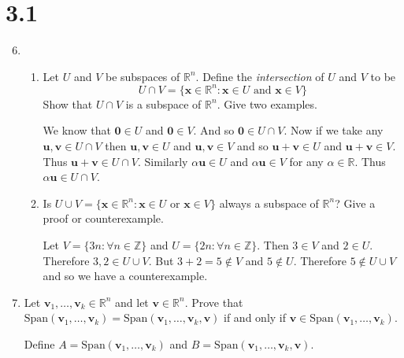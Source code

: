 \documentclass[letterpaper]{article}
\begin{document}
\section*{3.1}
\begin{enumerate}
\setcounter{enumi}{5}
\item
  \begin{enumerate}
  \item
  Let $U$ and $V$ be subspaces of $\mathbb{R}^n$. Define the \emph{intersection} of $U$ and $V$ to be
  \[U\cap V=\{\mathbf{x}\in \mathbb{R}^n:\mathbf{x}\in U\text{ and }\mathbf{x}\in V\}\]
  Show that $U\cap V$ is a subspace of $\mathbb{R}^n$. Give two examples.

  We know that $\mathbf{0}\in U$ and $\mathbf{0}\in V$. And so $\mathbf{0}\in U\cap V$. Now if we take any $\mathbf{u},\mathbf{v}\in U\cap V$ then $\mathbf{u},\mathbf{v}\in U$ and $\mathbf{u},\mathbf{v}\in V$ and so $\mathbf{u}+\mathbf{v}\in U$ and $\mathbf{u}+\mathbf{v}\in V$. Thus $\mathbf{u}+\mathbf{v}\in  U\cap V$. Similarly $\alpha\mathbf{u}\in U$ and $\alpha\mathbf{u}\in V$ for any $\alpha\in \mathbb{R}$. Thus $\alpha\mathbf{u}\in U\cap V$.
  \item
  Is $U\cup V=\{\mathbf{x}\in \mathbb{R}^n:\mathbf{x}\in U\text{ or }\mathbf{x}\in V\}$ always a subspace of $\mathbb{R}^n$? Give a proof or counterexample.

  Let $V=\{3n:\forall n\in \mathbb{Z}\}$ and $U=\{2n:\forall n\in \mathbb{Z}\}$. Then $3\in V$ and $2\in U$. Therefore $3,2\in U\cup V$. But $3+2=5\not\in V$ and $5\not\in U$. Therefore $5\not\in U\cup V$ and so we have a counterexample.
  \end{enumerate}
\setcounter{enumi}{7}
\item
Let $\mathbf{v}_1,\dots,\mathbf{v}_k\in \mathbb{R}^n$ and let $\mathbf{v}\in \mathbb{R}^n$. Prove that $\text{Span}(\mathbf{v}_1,\dots,\mathbf{v}_k)=\text{Span}(\mathbf{v}_1,\dots,\mathbf{v}_k,\mathbf{v})$ if and only if $\mathbf{v}\in \text{Span}(\mathbf{v}_1,\dots,\mathbf{v}_k)$.

Define $A=\text{Span}(\mathbf{v}_1,\dots,\mathbf{v}_k)$ and $B=\text{Span}(\mathbf{v}_1,\dots,\mathbf{v}_k,\mathbf{v})$.


\end{enumerate}
\end{document}
